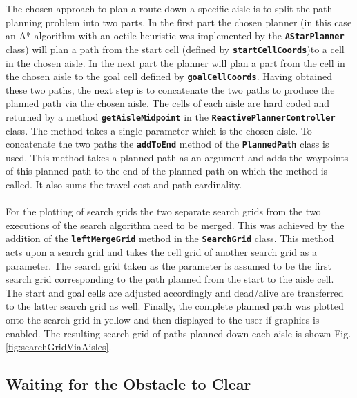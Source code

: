 \documentclass[a4paper,12pt]{article}
\begin{document}
		The chosen approach to plan a route down a specific aisle is to split the path planning problem into two parts. In the first part the chosen planner (in this case an A* algorithm with an octile heuristic was implemented by the \textbf{\texttt{AStarPlanner}} class) will plan a path from the start cell (defined by \textbf{\texttt{startCellCoords}})to a cell in the chosen aisle. In the next part the planner will plan a part from the cell in the chosen aisle to the goal cell defined by \textbf{\texttt{goalCellCoords}}. Having obtained these two paths, the next step is to concatenate the two paths to produce the planned path via the chosen aisle. The cells of each aisle are hard coded and returned by a method \textbf{\texttt{getAisleMidpoint}} in the \textbf{\texttt{ReactivePlannerController}} class. The method takes a single parameter which is the chosen aisle. To concatenate the two paths the \textbf{\texttt{addToEnd}} method of the \textbf{\texttt{PlannedPath}} class is used. This method takes a planned path as an argument and adds the waypoints of this planned path to the end of the planned path on which the method is called. It also sums the travel cost and path cardinality.
		\\
		\\
		For the plotting of search grids the two separate search grids from the two executions of the search algorithm need to be merged. This was achieved by the addition of the \textbf{\texttt{leftMergeGrid}} method in the \textbf{\texttt{SearchGrid}} class. This method acts upon a search grid and takes the cell grid of another search grid as a parameter. The search grid taken as the parameter is assumed to be the first search grid corresponding to the path planned from the start to the aisle cell. The start and goal cells are adjusted accordingly and dead/alive are transferred to the latter search grid as well. Finally, the complete planned path was plotted onto the search grid in yellow and then displayed to the user if graphics is enabled. The resulting search grid of paths planned down each aisle is shown Fig. \ref{fig:searchGridViaAisles}. 
	
	\subsection{Waiting for the Obstacle to Clear}
	\label{sec:waitingForTheObstacleToClearROS}
	
\end{document}

